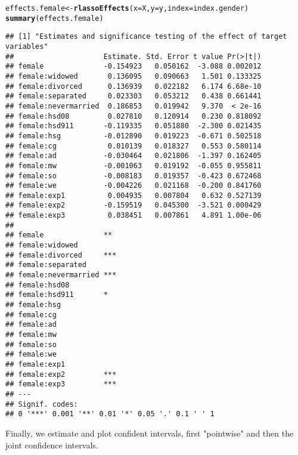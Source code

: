 \documentclass{amsart}\usepackage[]{graphicx}\usepackage[]{color}
\makeatletter
\newcommand{\hlstd}[1]{\textcolor[rgb]{0.345,0.345,0.345}{#1}}%
\newcommand{\hlkwb}[1]{\textcolor[rgb]{0.69,0.353,0.396}{#1}}%
\newcommand{\hlkwc}[1]{\textcolor[rgb]{0.333,0.667,0.333}{#1}}%
\newcommand{\hlkwd}[1]{\textcolor[rgb]{0.737,0.353,0.396}{\textbf{#1}}}%
\newenvironment{kframe}{%
 \def\at@end@of@kframe{}%
 \ifinner\ifhmode%
  \def\at@end@of@kframe{\end{minipage}}%
  \begin{minipage}{\columnwidth}%
 \fi\fi%
 \def\FrameCommand##1{\hskip\@totalleftmargin \hskip-\fboxsep
 \colorbox{shadecolor}{##1}\hskip-\fboxsep
     \hskip-\linewidth \hskip-\@totalleftmargin \hskip\columnwidth}%
 \MakeFramed {\advance\hsize-\width
   \@totalleftmargin\z@ \linewidth\hsize
   \@setminipage}}%
 {\par\unskip\endMakeFramed%
 \at@end@of@kframe}
\newenvironment{knitrout}{}{} %
\makeatother
\begin{document}
\begin{knitrout}
\color{fgcolor}\begin{kframe}
\begin{alltt}
\hlstd{effects.female} \hlkwb{<-} \hlkwd{rlassoEffects}\hlstd{(}\hlkwc{x} \hlstd{= X,} \hlkwc{y} \hlstd{= y,} \hlkwc{index} \hlstd{= index.gender)}
\hlkwd{summary}\hlstd{(effects.female)}
\end{alltt}
\begin{verbatim}
## [1] "Estimates and significance testing of the effect of target variables"
##                     Estimate. Std. Error t value Pr(>|t|)
## female              -0.154923   0.050162  -3.088 0.002012
## female:widowed       0.136095   0.090663   1.501 0.133325
## female:divorced      0.136939   0.022182   6.174 6.68e-10
## female:separated     0.023303   0.053212   0.438 0.661441
## female:nevermarried  0.186853   0.019942   9.370  < 2e-16
## female:hsd08         0.027810   0.120914   0.230 0.818092
## female:hsd911       -0.119335   0.051880  -2.300 0.021435
## female:hsg          -0.012890   0.019223  -0.671 0.502518
## female:cg            0.010139   0.018327   0.553 0.580114
## female:ad           -0.030464   0.021806  -1.397 0.162405
## female:mw           -0.001063   0.019192  -0.055 0.955811
## female:so           -0.008183   0.019357  -0.423 0.672468
## female:we           -0.004226   0.021168  -0.200 0.841760
## female:exp1          0.004935   0.007804   0.632 0.527139
## female:exp2         -0.159519   0.045300  -3.521 0.000429
## female:exp3          0.038451   0.007861   4.891 1.00e-06
##                        
## female              ** 
## female:widowed         
## female:divorced     ***
## female:separated       
## female:nevermarried ***
## female:hsd08           
## female:hsd911       *  
## female:hsg             
## female:cg              
## female:ad              
## female:mw              
## female:so              
## female:we              
## female:exp1            
## female:exp2         ***
## female:exp3         ***
## ---
## Signif. codes:  
## 0 '***' 0.001 '**' 0.01 '*' 0.05 '.' 0.1 ' ' 1
\end{verbatim}
\end{kframe}
\end{knitrout}


Finally, we estimate and plot confident intervals, first "pointwise" and then the joint confidence intervals.
\end{document}
